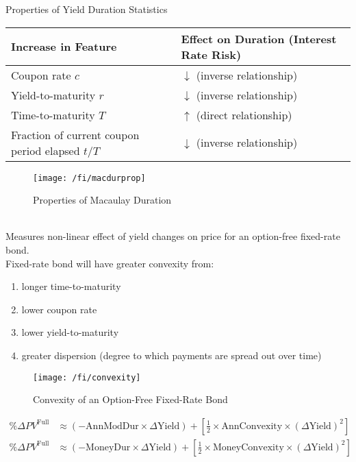 \begin{flushleft}
Properties of Yield Duration Statistics
\begin{tabularx}{\textwidth}{p{20em}|X}
\hline
\rowcolor{gray!30}
Increase in Feature & Effect on Duration (Interest Rate Risk) \\
\hline
Coupon rate $c$ & $\downarrow$ (inverse relationship) \\
\hline
Yield-to-maturity $r$ & $\downarrow$ (inverse relationship) \\
\hline
Time-to-maturity $T$ & $\uparrow$ (direct relationship) \\
\hline
Fraction of current coupon period elapsed $t/T$ & $\downarrow$ (inverse relationship) \\
\hline
\end{tabularx}
\end{flushleft}

\begin{figure}[H]
\centering
\texttt{[image: /fi/macdurprop]}
\caption{Properties of Macaulay Duration}
\end{figure}

\begin{definition} \\
Measures non-linear effect of yield changes on price for an option-free fixed-rate bond.\\
Fixed-rate bond will have greater convexity from:
\begin{enumerate}[label=\roman*.]
\setlength{\itemsep}{0pt}
\item longer time-to-maturity
\item lower coupon rate
\item lower yield-to-maturity
\item greater dispersion (degree to which payments are spread out over time)
\end{enumerate}
\end{definition}

\begin{figure}[H]
\centering
\texttt{[image: /fi/convexity]}
\caption{Convexity of an Option-Free Fixed-Rate Bond}
\end{figure}

\begin{remark} 
\begin{align}
\% \Delta PV^{\text{Full}} &\approx (-\text{AnnModDur} \times \Delta \text{Yield}) + \left[ \frac{1}{2} \times \text{AnnConvexity} \times (\Delta \text{Yield})^2 \right] \nonumber \\
\% \Delta PV^{\text{Full}} &\approx (-\text{MoneyDur} \times \Delta \text{Yield}) + \left[ \frac{1}{2} \times \text{MoneyConvexity} \times (\Delta \text{Yield})^2 \right] \nonumber
\end{align}
\end{remark}

